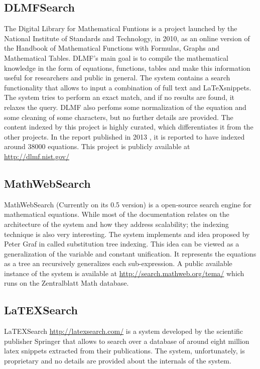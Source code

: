 \subsection{DLMFSearch}
The Digital Library for Mathematical Funtions \cite{dlmf} is a project launched by the National Institute of Standards and Technology, in 2010, as an online version of the  Handbook of Mathematical Functions with Formulas, Graphs and Mathematical Tables\cite{handbook}. DLMF's main goal is to compile the mathematical knowledge in the form of equations, functions, tables and make this information useful for researchers and public in general. The system contains a search functionality that allows to input a combination of full text and \LaTeX snippets. The system tries to perform an exact match, and if no results are found, it relaxes the query. DLMF also perfoms some normalization of the equation and some cleaning of some characters, but no further details are provided. The content indexed by this project is highly curated, which differentiates it from the other projects. In the report published in 2013 \cite{dlmf2}, it is reported to have indexed around 38000 equations. This project is publicly available at \url{http://dlmf.nist.gov/}

\subsection{MathWebSearch}
MathWebSearch\cite{mathwebsearch} (Currently on its 0.5 version) is a open-source search engine for mathematical equations. While most of the documentation relates on the architecture of the system and how they address scalability; the indexing technique is also very interesting. The system implements and idea proposed by Peter Graf in \cite{substitution_tree_indexing} called substitution tree indexing. This idea can be viewed as a generalization of the variable and constant unification. It represents the equations as a tree an recursively generalizes each sub-expression. A public available instance of the system is available at \url{http://search.mathweb.org/tema/} which runs on the Zentralblatt Math database\cite{zb}.


\subsection{LaTEXSearch}
LaTEXSearch \url{http://latexsearch.com/} is a system developed by the scientific publisher Springer that allows to search over a database of around eight million latex snippets extracted from their publications. The system, unfortunately, is proprietary and no details are provided about the internals of the system.


